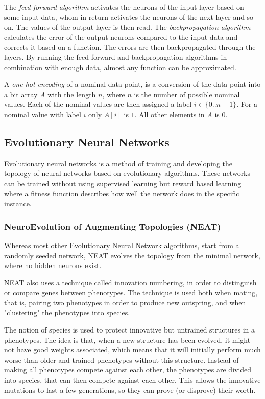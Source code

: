 \newpar The \textit{feed forward algorithm} activates the neurons of the input layer based on some input data, whom in return activates the neurons of the next layer and so on. The values of the output layer is then read. The \textit{backpropagation algorithm} calculates the error of the output neurons compared to the input data and corrects it based on a function. The errors are then backpropagated through the layers. By running the feed forward and backpropagation algorithms in combination with enough data, almost any function can be approximated.

\newpar A \textit{one hot encoding} of a nominal data point, is a conversion of the data point into a bit array $A$ with the length $n$, where $n$ is the number of possible nominal values. Each of the nominal values are then assigned a label $i \in \{0 .. n-1\}$. For a nominal value with label $i$ only $ A[i] $ is $1$. All other elements in $A$ is $0$.

\subsection{Evolutionary Neural Networks}
Evolutionary neural networks is a method of training and developing the topology of neural networks based on evolutionary algorithms. These networks can be trained without using supervised learning but reward based learning where a fitness function describes how well the network does in the specific instance. 

\subsubsection{NeuroEvolution of Augmenting Topologies (NEAT)}
Whereas most other Evolutionary Neural Network algorithms, start from a randomly seeded network, NEAT evolves the topology from the minimal network, where no hidden neurons exist.

\newpar NEAT also uses a technique called innovation numbering, in order to distinguish or compare genes between phenotypes. The technique is used both when mating, that is, pairing two phenotypes in order to produce new outspring, and when "clustering" the phenotypes into species.

\newpar The notion of species is used to protect innovative but untrained structures in a phenotypes. The idea is that, when a new structure has been evolved, it might not have good weights associated, which means that it will initially perform much worse than older and trained phenotypes without this structure. Instead of making all phenotypes compete against each other, the phenotypes are divided into species, that can then compete against each other. This allows the innovative mutations to last a few generations, so they can prove (or disprove) their worth.

